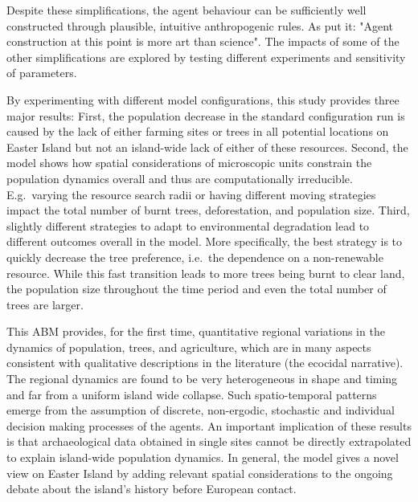 Despite these simplifications, the agent behaviour can be sufficiently well constructed through plausible, intuitive anthropogenic rules.
As \citet{Kohler2000} put it: "Agent construction at this point is more art than science".
The impacts of some of the other simplifications are explored by testing different experiments and sensitivity of parameters.

By experimenting with different model configurations, this study provides three major results:
First, the population decrease in the standard configuration run is caused by the lack of either farming sites or trees in all potential locations on Easter Island but not an island-wide lack of either of these resources.
Second, the model shows how spatial considerations of microscopic units constrain the population dynamics overall and thus are computationally irreducible.
E.g.\ varying the resource search radii or having different moving strategies impact the total number of burnt trees, deforestation, and population size.
Third, slightly different strategies to adapt to environmental degradation lead to different outcomes overall in the model. 
More specifically, the best strategy is to quickly decrease the tree preference, i.e.\ the dependence on a non-renewable resource. While this fast transition leads to more trees being burnt to clear land, the population size throughout the time period and even the total number of trees are larger. 

This ABM provides, for the first time, quantitative regional variations in the dynamics of population, trees, and agriculture, which are in many aspects consistent with qualitative descriptions in the literature (the ecocidal narrative).
The regional dynamics are found to be very heterogeneous in shape and timing and far from a uniform island wide collapse.
Such spatio-temporal patterns emerge from the assumption of discrete, non-ergodic, stochastic and individual decision making processes of the agents.
An important implication of these results is that archaeological data obtained in single sites cannot be directly extrapolated to explain island-wide population dynamics.
In general, the model gives a novel view on Easter Island by adding relevant spatial considerations to the ongoing debate about the island's history before European contact.

